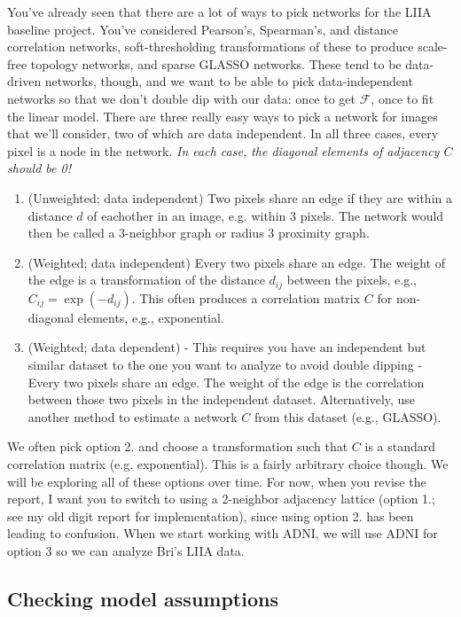 \documentclass[12pt]{article}
\begin{document}
You've already seen that there are a lot of ways to pick networks for the LIIA baseline project. You've considered Pearson's, Spearman's, and distance correlation networks, soft-thresholding transformations of these to produce scale-free topology networks, and sparse GLASSO networks. These tend to be data-driven networks, though, and we want to be able to pick data-independent networks so that we don't double dip with our data: once to get $\mathcal F$, once to fit the linear model. There are three really easy ways to pick a network for images that we'll consider, two of which are data independent. In all three cases, every pixel is a node in the network. \textit{In each case, the diagonal elements of adjacency $C$ should be 0!}

\begin{enumerate}
	\item (Unweighted; data independent) Two pixels share an edge if they are within a distance $d$ of eachother in an image, e.g. within 3 pixels. The network would then be called a 3-neighbor graph or radius 3 proximity graph.
	\item (Weighted; data independent) Every two pixels share an edge. The weight of the edge is a transformation of the distance $d_{ij}$ between the pixels, e.g., $C_{ij}=\exp(-d_{ij})$. This often produces a correlation matrix $C$ for non-diagonal elements, e.g., exponential.
	\item (Weighted; data dependent) - This requires you have an independent but similar dataset to the one you want to analyze to avoid double dipping - Every two pixels share an edge. The weight of the edge is the correlation between those two pixels in the independent dataset. Alternatively, use another method to estimate a network $C$ from this dataset (e.g., GLASSO).
\end{enumerate}

We often pick option 2. and choose a transformation such that $C$ is a standard correlation matrix (e.g. exponential). This is a fairly arbitrary choice though. We will be exploring all of these options over time. For now, when you revise the report, I want you to switch to using a 2-neighbor adjacency lattice (option 1.; see my old digit report for implementation), since using option 2. has been leading to confusion. When we start working with ADNI, we will use ADNI for option 3 so we can analyze Bri's LIIA data.

\subsection*{Checking model assumptions}
\end{document}
